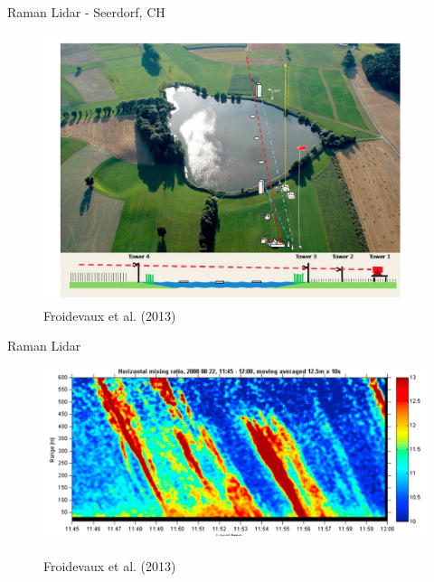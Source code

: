 
\begin{frame}{Raman Lidar - Seerdorf, CH}
 \begin{figure}
      \includegraphics[width=0.95\textwidth]{fig7.png}
      \centering \tiny~\\Froidevaux et al. (2013)
  \end{figure}
\end{frame}


\begin{frame}{Raman Lidar}
 \begin{figure}
      \includegraphics[width=\textwidth]{fig8.png}
      \centering \tiny~\\Froidevaux et al. (2013)
  \end{figure}
\end{frame}


